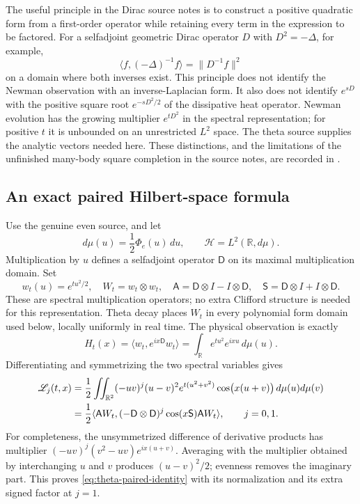 \documentclass[11pt]{article}
\numberwithin{equation}{section}
\theoremstyle{definition}
\theoremstyle{remark}
\begin{document}
The useful principle in the Dirac source notes is to construct a positive
quadratic form from a first-order operator while retaining every term in
the expression to be factored.  For a selfadjoint geometric Dirac operator
$D$ with $D^2=-\Delta$, for example,
\[
 \langle f,(-\Delta)^{-1}f\rangle=\|D^{-1}f\|^2
\]
on a domain where both inverses exist.  This principle does not identify
the Newman observation with an inverse-Laplacian form.  It also does not
identify $e^{sD}$ with the positive square root $e^{-sD^2/2}$ of the
dissipative heat operator.  Newman evolution has the growing multiplier
$e^{tD^2}$ in the spectral representation; for positive $t$ it is
unbounded on an unrestricted $L^2$ space.  The theta source supplies the
analytic vectors needed here.  These distinctions, and the limitations
of the unfinished many-body square completion in the source notes,
are recorded in \cite{seedreview,diracnote}.

\subsection{An exact paired Hilbert-space formula}
\label{sec:theta-paired}

Use the genuine even source, and let
\[
 d\mu(u)=\frac12\Phi_e(u)\,du,\qquad
 \mathcal H=L^2(\mathbb R,d\mu).
\]
Multiplication by $u$ defines a selfadjoint operator $\mathsf D$ on its
maximal multiplication domain.  Set
\[
 w_t(u)=e^{tu^2/2},\quad W_t=w_t\otimes w_t,\quad
 \mathsf A=\mathsf D\otimes I-I\otimes\mathsf D,\quad
 \mathsf S=\mathsf D\otimes I+I\otimes\mathsf D.
\]
These are spectral multiplication operators; no extra Clifford
structure is needed for this representation.  Theta decay places
$W_t$ in every polynomial form domain used below, locally uniformly in
real time.  The physical observation is exactly
\begin{equation}
 H_t(x)=\langle w_t,e^{ix\mathsf D}w_t\rangle
       =\int_{\mathbb R}e^{tu^2}e^{ixu}\,d\mu(u).
 \label{eq:theta-one-body}
\end{equation}
Differentiating and symmetrizing the two spectral variables gives
\begin{align}
 \mathscr L_j(t,x)
 &=\frac12\iint_{\mathbb R^2}
     (-uv)^j(u-v)^2e^{t(u^2+v^2)}
                  \cos\bigl(x(u+v)\bigr)\,d\mu(u)d\mu(v)
 \notag\\
 &=\frac12\langle\mathsf A W_t,
       (-\mathsf D\otimes\mathsf D)^j
                       \cos(x\mathsf S)\mathsf A W_t\rangle,
 \qquad j=0,1.
 \label{eq:theta-paired-identity}
\end{align}
For completeness, the unsymmetrized difference of derivative products
has multiplier
$(-uv)^j(v^2-uv)e^{ix(u+v)}$.  Averaging with the multiplier obtained by
interchanging $u$ and $v$ produces $(u-v)^2/2$; evenness removes the
imaginary part.  This proves \eqref{eq:theta-paired-identity} with its
normalization and its extra signed factor at $j=1$.
\end{document}
